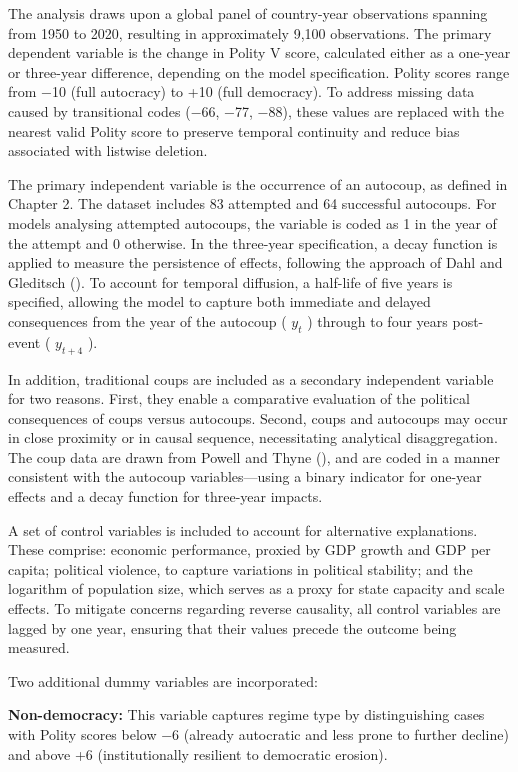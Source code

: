 \documentclass[
  12pt,
]{report}
\begin{document}
The analysis draws upon a global panel of country-year observations
spanning from 1950 to 2020, resulting in approximately 9,100
observations. The primary dependent variable is the change in Polity V
score, calculated either as a one-year or three-year difference,
depending on the model specification. Polity scores range from −10 (full
autocracy) to +10 (full democracy). To address missing data caused by
transitional codes (−66, −77, −88), these values are replaced with the
nearest valid Polity score to preserve temporal continuity and reduce
bias associated with listwise deletion.

The primary independent variable is the occurrence of an autocoup, as
defined in Chapter 2. The dataset includes 83 attempted and 64
successful autocoups. For models analysing attempted autocoups, the
variable is coded as 1 in the year of the attempt and 0 otherwise. In
the three-year specification, a decay function is applied to measure the
persistence of effects, following the approach of Dahl and Gleditsch
(). To account for temporal diffusion, a
half-life of five years is specified, allowing the model to capture both
immediate and delayed consequences from the year of the autocoup (
\(y_t\) ) through to four years post-event ( \(y_{t+4}\) ).

In addition, traditional coups are included as a secondary independent
variable for two reasons. First, they enable a comparative evaluation of
the political consequences of coups versus autocoups. Second, coups and
autocoups may occur in close proximity or in causal sequence,
necessitating analytical disaggregation. The coup data are drawn from
Powell and Thyne (), and are coded in a
manner consistent with the autocoup variables---using a binary indicator
for one-year effects and a decay function for three-year impacts.

A set of control variables is included to account for alternative
explanations. These comprise: economic performance, proxied by GDP
growth and GDP per capita; political violence, to capture variations in
political stability; and the logarithm of population size, which serves
as a proxy for state capacity and scale effects. To mitigate concerns
regarding reverse causality, all control variables are lagged by one
year, ensuring that their values precede the outcome being measured.

Two additional dummy variables are incorporated:

\textbf{Non-democracy:} This variable captures regime type by
distinguishing cases with Polity scores below −6 (already autocratic and
less prone to further decline) and above +6 (institutionally resilient
to democratic erosion).
\end{document}
